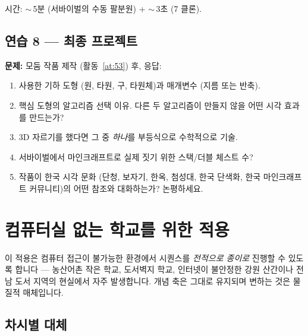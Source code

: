 \documentclass[12pt,a4paper]{scrartcl}
\begin{document}
시간: $\sim$\,5분 (서바이벌의 수동 팔분원) + $\sim$\,3초 (7 클론).

\subsection*{연습 8 --- 최종 프로젝트}
\textbf{문제:} 모둠 작품 제작 (활동~\ref{at:53}) 후, 응답:
\begin{enumerate}[label=(\arabic*),leftmargin=1.7em,itemsep=0.15em,topsep=0.2em,nosep]
  \item 사용한 기하 도형 (원, 타원, 구, 타원체)과 매개변수 (지름 또는 반축).
  \item 핵심 도형의 알고리즘 선택 이유. 다른 두 알고리즘이 만들지 않을 어떤 시각 효과를 만드는가?
  \item 3D 자르기를 했다면 그 중 \emph{하나}를 부등식으로 수학적으로 기술.
  \item 서바이벌에서 마인크래프트로 실제 짓기 위한 스택/더블 체스트 수?
  \item 작품이 한국 시각 문화 (단청, 보자기, 한옥, 첨성대, 한국 단색화, 한국 마인크래프트 커뮤니티)의 어떤 참조와 대화하는가? 논평하세요.
\end{enumerate}

\newpage
\section{컴퓨터실 없는 학교를 위한 적용}\label{ap:adapt-analog}

이 적용은 컴퓨터 접근이 불가능한 환경에서 시퀀스를 \emph{전적으로 종이로} 진행할 수 있도록 합니다 --- 농산어촌 작은 학교, 도서벽지 학교, 인터넷이 불안정한 강원 산간이나 전남 도서 지역의 현실에서 자주 발생합니다. 개념 축은 그대로 유지되며 변하는 것은 물질적 매체입니다.

\subsection{차시별 대체}
\end{document}
